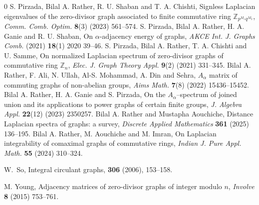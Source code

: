 \documentclass[12pt,twoside]{article}
\begin{document}
\begin{thebibliography}{0}
		 S. Pirzada,  Bilal A. Rather, R. U. Shaban and T. A. Chishti, Signless Laplacian eigenvalues of the zero-divisor graph associated to finite commutative ring $ \mathbb{Z}_{p^{M_{1}} q^{M_{2}}} $, \emph{Comm. Comb. Optim.} \textbf{8}(3) (2023) 561--574.
		 S. Pirzada,   Bilal A. Rather, H. A. Ganie and R. U. Shaban, On $ \alpha $-adjacency energy of graphs,  \emph{AKCE Int. J. Graphs Comb.} (2021) \textbf{18}(1) 2020 39--46.
		 S. Pirzada,  Bilal A. Rather, T. A. Chishti and U. Samme, On normalized Laplacian spectrum of zero-divisor graphs of commutative ring  $ \mathbb{Z}_{n} $, \emph{Elec. J. Graph Theory  Appl.} \textbf{9}(2) (2021) 331--345.
			Bilal A. Rather, F. Ali, N. Ullah, Al-S. Mohammad, A. Din and  Sehra, $ A_{\alpha} $ matrix of commuting graphs of non-abelian groups, \textit{Aims Math.} \textbf{7}(8) (2022) 15436--15452.
			  Bilal A. Rather, H. A. Ganie and S. Pirzada, On the $ A_{\alpha} $--spectrum of joined union and its applications to power graphs of certain finite groups,  \emph{J. Algebra  Appl.} \textbf{22}(12) (2023) 2350257.
		 Bilal A. Rather and Mustapha Aouchiche, Distance Laplacian spectra of graphs: a survey, \emph{Discrete Applied Mathematics} \textbf{361} (2025) 136--195.
		 Bilal A. Rather, M. Aouchiche and M. Imran,  On Laplacian integrability of comaximal graphs of commutative rings, \emph{Indian J. Pure Appl. Math.} \textbf{55}  (2024) 310--324. %
	
		W.~So,
		\newblock Integral circulant graphs,
		 {\bf 306} (2006), 153--158.
		
		 M. Young, Adjacency matrices of zero-divisor graphs of integer modulo $ n $, \emph {Involve} {\bf 8} (2015) 753--761.
		
		
		
		
	\end{thebibliography}
\end{document}
